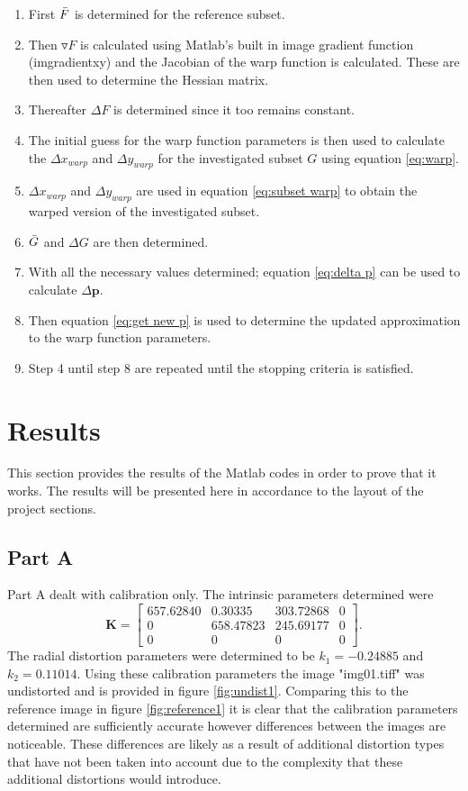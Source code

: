 \documentclass[[12pt,oneside,openany,a4paper, %
\newcommand*\mean[1]{\bar{#1}} %
\begin{document}
\begin{enumerate}
  \item First $\mean{F}$ is determined for the reference subset.
  \item Then $\triangledown F$ is calculated using Matlab's built in image gradient function (imgradientxy) and the Jacobian of the warp function is calculated. These are then used to determine the Hessian matrix.
  \item Thereafter $\Delta F$ is determined since it too remains constant.
  \item The initial guess for the warp function parameters is then used to calculate the $\Delta x_{warp}$ and $\Delta y_{warp}$ for the investigated subset $G$ using equation \ref{eq:warp}.
  \item $\Delta x_{warp}$ and $\Delta y_{warp}$ are used in equation \ref{eq:subset warp} to obtain the warped version of the investigated subset.
  \item $\mean{G}$ and $\Delta G$ are then determined.
  \item With all the necessary values determined; equation \ref{eq:delta p} can be used to calculate $\Delta \bm{p}$.
  \item Then equation \ref{eq:get new p} is used to determine the updated approximation to the warp function parameters.
  \item Step 4 until step 8 are repeated until the stopping criteria is satisfied.
\end{enumerate}


\chapter{Results}
This section provides the results of the Matlab codes in order to prove that it works. The results will be presented here in accordance to the layout of the project sections.

\section{Part A}
Part A dealt with calibration only. The intrinsic parameters determined were
\begin{equation}
  \bm{K} = \begin{bmatrix}
  657.62840 & 0.30335 & 303.72868 & 0\\
  0 & 658.47823 & 245.69177 & 0\\
  0 & 0 & 0 & 0
  \end{bmatrix}.
\end{equation}
The radial distortion parameters were determined to be $k_1 = -0.24885$ and $k_2 = 0.11014$. Using these calibration parameters the image "img01.tiff" was undistorted and is provided in figure \ref{fig:undist1}. Comparing this to the reference image in figure \ref{fig:reference1} it is clear that the calibration parameters determined are sufficiently accurate however differences between the images are noticeable. These differences are likely as a result of additional distortion types that have not been taken into account due to the complexity that these additional distortions would introduce.
\end{document}
